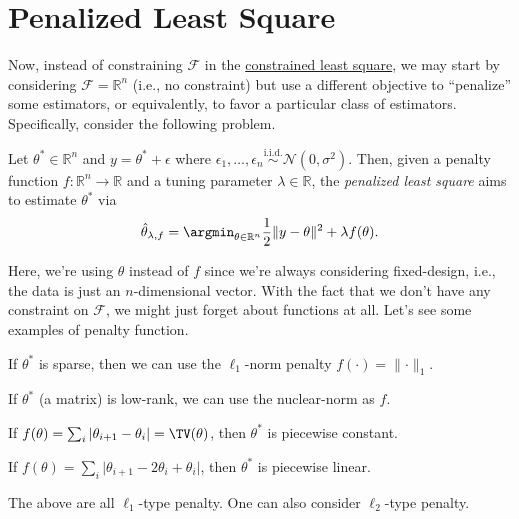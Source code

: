 \section{Penalized Least Square}
Now, instead of constraining \(\mathscr{F} \) in the \hyperref[prb:constrained-LS]{constrained least square}, we may start by considering \(\mathscr{F} = \mathbb{R} ^n\) (i.e., no constraint) but use a different objective to ``penalize'' some estimators, or equivalently, to favor a particular class of estimators. Specifically, consider the following problem.

\begin{problem}\label{prb:penalized-LS}
Let \(\theta ^{\ast} \in \mathbb{R} ^n\) and \(y = \theta ^{\ast} + \epsilon \) where \(\epsilon _1, \dots , \epsilon _n \overset{\text{i.i.d.} }{\sim } \mathcal{N} (0, \sigma ^2)\). Then, given a penalty function \(f\colon \mathbb{R} ^n \to \mathbb{R} \) and a tuning parameter \(\lambda \in \mathbb{R} \), the \emph{penalized least square} aims to estimate \(\theta ^{\ast} \) via
\[
	\hat{\theta}_{\lambda , f} = \argmin_{\theta \in \mathbb{R} ^n} \frac{1}{2} \lVert y - \theta \rVert ^2 + \lambda f(\theta ).
\]
\end{problem}

Here, we're using \(\theta \) instead of \(f\) since we're always considering fixed-design, i.e., the data is just an \(n\)-dimensional vector. With the fact that we don't have any constraint on \(\mathscr{F} \), we might just forget about functions at all. Let's see some examples of penalty function.

\begin{eg}
	If  \(\theta^{\ast} \) is sparse, then we can use the \(\ell _1\)-norm penalty \(f(\cdot) = \lVert \cdot \rVert _1\).
\end{eg}

\begin{eg}
	If \(\theta ^{\ast} \) (a matrix) is low-rank, we can use the nuclear-norm as \(f\).
\end{eg}

\begin{eg}
	If \(f(\theta ) = \sum_{i} \vert \theta _{i+1} - \theta _i \vert = \TV(\theta )\), then \(\theta ^{\ast} \) is piecewise constant.
\end{eg}

\begin{eg}
	If \(f(\theta ) = \sum_{i} \vert \theta _{i+1} - 2 \theta _i + \theta _i\vert \), then \(\theta ^{\ast} \) is piecewise linear.
\end{eg}
The above are all \(\ell _1\)-type penalty. One can also consider \(\ell _2\)-type penalty.

